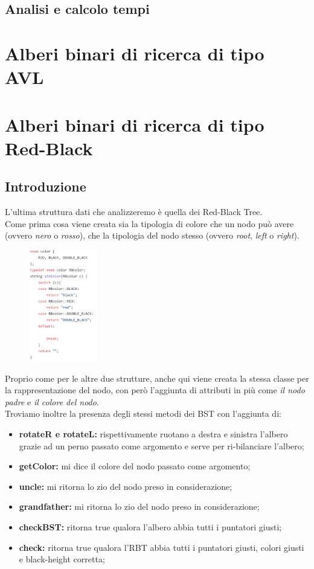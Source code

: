 \documentclass[a4paper]{article}
\begin{document}
		 	\subsection{Analisi e calcolo tempi}
	   	 \newpage
		\section{Alberi binari di ricerca di tipo AVL}
		\newpage
		
		\section{Alberi binari di ricerca di tipo Red-Black}
			\subsection{Introduzione}
			L'ultima struttura dati che analizzeremo è quella dei Red-Black Tree.\\
			Come prima cosa viene creata sia la tipologia di colore che un nodo può avere (ovvero \textit{nero} o \textit{rosso}), che la tipologia del nodo stesso (ovvero \textit{root}, \textit{left} o \textit{right}).\\
			\begin{figure}[ht]
				\includegraphics[width=3cm]{Enum}
			\end{figure}
			Proprio come per le altre due strutture, anche qui viene creata la stessa classe per la rappresentazione del nodo, con però l'aggiunta di attributi in più come \textit{il nodo padre} e \textit{il colore del nodo}.\\
			Troviamo inoltre la presenza degli stessi metodi dei BST con l'aggiunta di:
			\begin{itemize}
				\item \textbf{rotateR e rotateL:} rispettivamente ruotano a destra e sinistra l'albero grazie ad un perno passato come argomento e serve per ri-bilanciare l'albero;
				\item \textbf{getColor:} mi dice il colore del nodo passato come argomento;
				\item \textbf{uncle:} mi ritorna lo zio del nodo preso in considerazione;
				\item \textbf{grandfather:} mi ritorna lo zio del nodo preso in considerazione;
				\item \textbf{checkBST:} ritorna true qualora l'albero abbia tutti i puntatori giusti;
				\item \textbf{check:} ritorna true qualora l'RBT abbia tutti i puntatori giusti, colori giusti e black-height corretta;
			\end{itemize}
			
\end{document}

